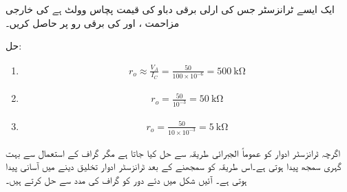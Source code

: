 ایک ایسے   ٹرانزسٹر جس کی ارلی برقی دباو کی قیمت پچاس وولٹ   ہے کی خارجی مزاحمت  ، اور   کی برقی رو پر حاصل کریں۔

حل:
\begin{enumerate}
\item
\begin{align*}
r_o \approx \frac{V_A}{I_C}=\frac{50}{100 \times 10^{-6}}=\SI{500}{\kilo \ohm}
\end{align*}

\item
\begin{align*}
r_o = \frac{50}{10^{-3}}=\SI{50}{\kilo \ohm}
\end{align*}

\item
\begin{align*}
r_o = \frac{50}{10 \times 10^{-3}}=\SI{5}{\kilo \ohm}
\end{align*}

\end{enumerate}

اگرچہ ٹرانزسٹر ادوار کو عموماً الجبرائی طریقہ سے حل کیا جاتا ہے مگر گراف کے استعمال سے بہت گہری سمجھ پیدا ہوتی ہے۔اس طریقہ کو سمجھنے کے بعد ٹرانزسٹر ادوار تخلیق دینے میں آسانی پیدا ہوتی ہے۔ آئیں شکل   میں دئے دور کو گراف کی مدد سے حل کرتے ہیں۔

